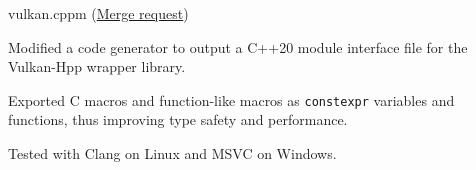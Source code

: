 
\begin{cventries}
	{vulkan.cppm \footnotesize{(\href{https://github.com/KhronosGroup/Vulkan-Hpp/pull/1582}{Merge request})}} %
	{} %
	{} %
	{
		\begin{cvitems} %
			\item Modified a code generator to output a C++20 module interface file for the Vulkan-Hpp wrapper library.
			\item Exported C macros and function-like macros as \texttt{constexpr} variables and functions, thus improving type safety and performance.
			\item Tested with Clang on Linux and MSVC on Windows.
		\end{cvitems}
	}
\end{cventries}
